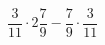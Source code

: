 \begin{ex}[type=calculate_rational]
	\begin{condition}
		\( \dfrac{3}{11}\cdot2\dfrac{7}{9}-\dfrac{7}{9}\cdot\dfrac{3}{11} \)
	\end{condition}
	\answer{}
\end{ex}